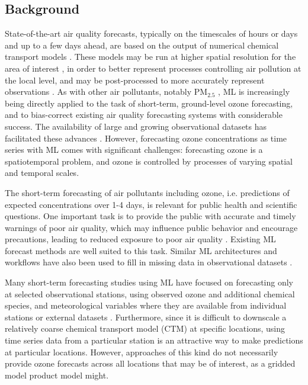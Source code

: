 \documentclass[gmd, manuscript]{copernicus}
\begin{document}
\subsection{Background}
State-of-the-art air quality forecasts, typically on the timescales of hours or days and up to a few days ahead, are based on the output of numerical chemical transport models \citep{Marecal2015}. These models may be run at higher spatial resolution for the area of interest \citep{Savage2013}, in order to better represent processes controlling air pollution at the local level, and may be post-processed to more accurately represent observations \citep{Casciaro2022}. As with other air pollutants, notably PM$_{2.5}$ \citep{Feng2015}, ML is increasingly being directly applied to the task of short-term, ground-level ozone forecasting, and to bias-correct existing air quality forecasting systems with considerable success. The availability of large and growing observational datasets has facilitated these advances \citep{Schultz2017}. However, forecasting ozone concentrations as time series with ML comes with significant challenges: forecasting ozone is a spatiotemporal problem, and ozone is controlled by processes of varying spatial and temporal scales.  

The short-term forecasting of air pollutants including ozone, i.e. predictions of expected concentrations over 1-4 days, is relevant for public health and scientific questions. One important task is to provide the public with accurate and timely warnings of poor air quality, which may influence public behavior and encourage precautions, leading to reduced exposure to poor air quality \citep{Buonocore2021, Hahm2021, Alari2021, Saberian2017}. Existing ML forecast methods are well suited to this task. Similar ML architectures and workflows have also been used to fill in missing data in observational datasets \citep{betancourt_global_2022, Wu2024}. 

Many short-term forecasting studies using ML have focused on forecasting only at selected observational stations, using observed ozone and additional chemical species, and meteorological variables where they are available from individual stations or external datasets \citep{Comrie1997, cobourn_comparison_2000, Kolehmainen2001,Eslami2020, sayeed_novel_2021, leufen_o3resnet_2023, Hickman2023}. Furthermore, since it is difficult to downscale a relatively coarse chemical transport model (CTM) at specific locations, using time series data from a particular station is an attractive way to make predictions at particular locations. However, approaches of this kind do not necessarily provide ozone forecasts across all locations that may be of interest, as a gridded model product model might.
\end{document}
